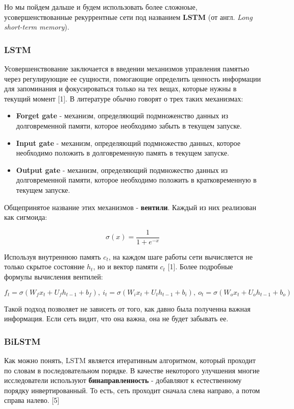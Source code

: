 Но мы пойдем дальше и будем использовать более сложноые, усовершенствованные рекуррентные сети под названием \textbf{LSTM} (от англ. \textit{Long short-term memory}).


\subsubsection{LSTM}
Усовершенствование заключается в введении механизмов управления памятью через регулирующие ее сущности, помогающие определить ценность информации для запоминания и фокусироваться только на тех вещах, которые нужны в текущий момент [1]. В литературе обычно говорят о трех таких механизмах:

\begin{itemize}
    \item \textbf{Forget gate} - механизм, определяющий подмноженство данных из долговременной памяти, которое необходимо забыть в текущем запуске.
    \item \textbf{Input gate} - механизм, определяющий подмножество данных, которое необходимо положить в долговременную память в текущем запуске.
    \item \textbf{Output gate} - механизм, определяющий подмножество данных из долговременной памяти, которое необходимо положить в кратковременную в текущем запуске.
\end{itemize}

Общепринятое название этих механизмов - \textbf{вентили}. Каждый из них реализован как сигмоида:

$$\sigma(x) = \frac{1}{1 + e^{-x}}$$

Используя внутреннюю память $c_t$, на каждом шаге работы сети вычисляется не только скрытое состояние $h_t$, но и вектор памяти $c_t$ [1]. Более подробные формулы вычисления вентилей:

$$f_t = \sigma(W_f x_t + U_f h_{t - 1} + b_f), ~i_t = \sigma(W_i x_t + U_t h_{t - 1} + b_i), ~ o_t = \sigma (W_o x_t + U_o h_{t - 1} + b_o)$$

Такой подход позволяет не зависеть от того, как давно была полученна важная информация. Если сеть видит, что она важна, она не будет забывать ее.

\subsubsection{BiLSTM}

Как можно понять, LSTM является итеративным алгоритмом, который проходит по словам в последовательном порядке. В качестве некоторого улучшения многие исследователи используют \textbf{бинаправленность} - добавляют к естественному порядку инвертированный. То есть, сеть проходит сначала слева направо, а потом справа налево. [5]

